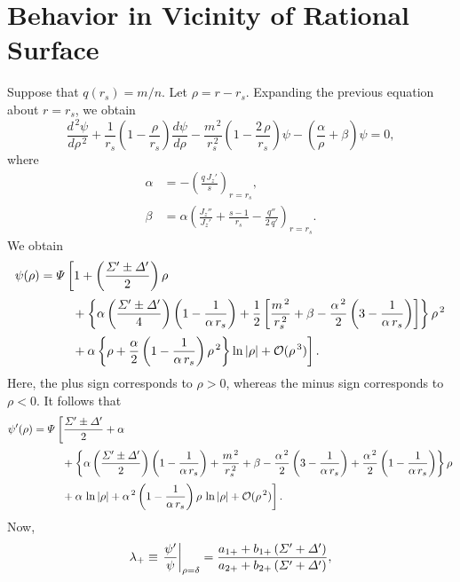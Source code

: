 \documentclass[notitlepage,12pt]{article}
\begin{document}
\section{Behavior in Vicinity of Rational Surface}
Suppose that $q(r_s)=m/n$. Let $\rho = r-r_s$. Expanding the previous equation about $r=r_s$, we obtain
\begin{equation}
\frac{d^{\,2}\psi}{d\rho^{\,2}} + \frac{1}{r_s}\left(1-\frac{\rho}{r_s}\right)\frac{d\psi}{d\rho} - \frac{m^{\,2}}{r_s^{\,2}}\left(1-\frac{2\,\rho}{r_s}\right)\psi - 
\left(\frac{\alpha}{\rho} + \beta\right)\psi = 0,
\end{equation}
where
\begin{align}
\alpha &= -\left(\frac{q\,J_z'}{s}\right)_{r=r_s},\\[0.5ex]
\beta &= \alpha\left(\frac{J_z''}{J_z'} +\frac{s-1}{r_s}-\frac{q''}{2\,q'}\right)_{r=r_s}.
\end{align}
We obtain
\begin{align}
\psi(\rho) &= {\mit\Psi}\left[1+\left(\frac{{\mit\Sigma}'\pm{\mit\Delta}'}{2}\right)\rho\right.\nonumber\\[0.5ex]
&\left.\phantom{===}+\left\{\alpha\left(\frac{{\mit\Sigma}'\pm{\mit\Delta}'}{4}\right)\left(1-\frac{1}{\alpha\,r_s}\right)+\frac{1}{2}\left[
\frac{m^{\,2}}{r_s^{\,2}} +\beta - \frac{\alpha^{\,2}}{2}\left(3-\frac{1}{\alpha\,r_s}\right)\right]\right\}\rho^{\,2}\right.\nonumber\\[0.5ex]
&\left.\phantom{===}+\alpha\left\{\rho + \frac{\alpha}{2}\left(1-\frac{1}{\alpha\,r_s}\right)\rho^{\,2}\right\}\ln|\rho|+{\cal O}(\rho^{\,3})
\right].
\end{align}
Here, the plus sign corresponds to $\rho>0$, whereas the minus sign corresponds to $\rho<0$.
It follows that
\begin{align}
\psi'(\rho) &= {\mit\Psi}\left[\frac{{\mit\Sigma}'\pm{\mit\Delta}'}{2}+\alpha\right.\nonumber\\[0.5ex]
&\left.\phantom{===}+\left\{\alpha\left(\frac{{\mit\Sigma}'\pm{\mit\Delta}'}{2}\right)\left(1-\frac{1}{\alpha\,r_s}\right)+
\frac{m^{\,2}}{r_s^{\,2}} +\beta - \frac{\alpha^{\,2}}{2}\left(3-\frac{1}{\alpha\,r_s}\right)
+\frac{\alpha^{\,2}}{2}\left(1-\frac{1}{\alpha\,r_s}\right)\right\}\rho\right.\nonumber\\[0.5ex]
&\left.\phantom{===}+\alpha\,\ln|\rho| + \alpha^{\,2}\left(1-\frac{1}{\alpha\,r_s}\right)\rho\,\ln|\rho|+{\cal O}(\rho^{\,2})
\right].
\end{align}
Now,
\begin{equation}
\lambda_+\equiv \left.\frac{\psi'}{\psi}\right|_{\rho =\delta} = \frac{a_{1+}+b_{1+}\,({\mit\Sigma}'+{\mit\Delta'})}{a_{2+}+ b_{2+}\,({\mit\Sigma}'+{\mit\Delta'})},
\end{equation}
\end{document}
